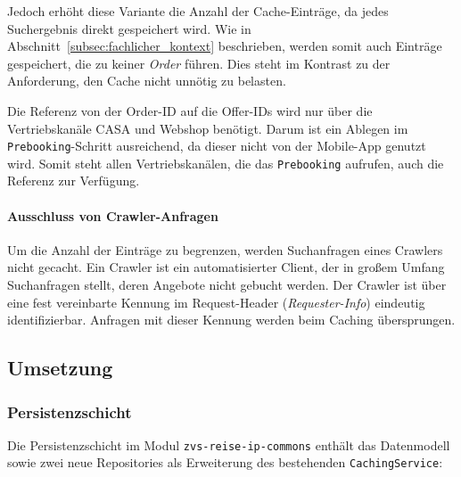 Jedoch erhöht diese Variante die Anzahl der Cache-Einträge, da jedes Suchergebnis direkt gespeichert wird. Wie in Abschnitt~\ref{subsec:fachlicher_kontext} beschrieben, werden somit auch Einträge gespeichert, die zu keiner \textit{Order} führen. Dies steht im Kontrast zu der Anforderung, den Cache nicht unnötig zu belasten.

Die Referenz von der Order-ID auf die Offer-IDs wird nur über die Vertriebskanäle CASA und Webshop benötigt. Darum ist ein Ablegen im \texttt{Prebooking}-Schritt ausreichend, da dieser nicht von der Mobile-App genutzt wird. Somit steht allen Vertriebskanälen, die das \texttt{Prebooking} aufrufen, auch die Referenz zur Verfügung.

\paragraph{Ausschluss von Crawler-Anfragen}
Um die Anzahl der Einträge zu begrenzen, werden Suchanfragen eines Crawlers nicht gecacht. Ein Crawler ist ein automatisierter Client, der in großem Umfang Suchanfragen stellt, deren Angebote nicht gebucht werden. Der Crawler ist über eine fest vereinbarte Kennung im Request-Header (\textit{Requester-Info}) eindeutig identifizierbar. Anfragen mit dieser Kennung werden beim Caching übersprungen. %



\subsection{Umsetzung}
\label{subsec:umsetzung}

\subsubsection{Persistenzschicht}
\label{subsubsec:persistenz}

Die Persistenzschicht im Modul \texttt{zvs-reise-ip-commons} enthält das Datenmodell sowie zwei neue Repositories als Erweiterung des bestehenden \texttt{CachingService}:

